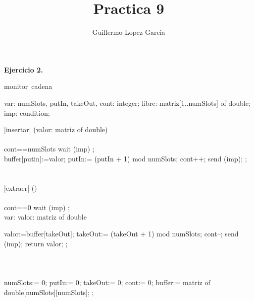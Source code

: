 \documentclass[]{article}
\title{Practica 9}
\author{Guillermo Lopez Garcia}
\begin{document}
\maketitle

\textbf{Ejercicio 2.}

\begin{program} %
\mbox{monitor cadena} %

var:
numSlots, putIn, takeOut, cont: integer;
libre: matriz[1..numSlots] of double;
imp: condition;

\PROC|insertar| (valor: matriz of double) \BODY\\ %

\BEGIN\\
\DO{}
\IF{} cont==numSlots \THEN{} wait (imp) \FI;\\
    buffer[putin]:=valor;
    putIn:= (putIn + 1) mod numSlots;
    cont++;
    send (imp);
\OD;\\

\END\\

\ENDPROC\\

\PROC|extraer| () \BODY\\ %

\BEGIN\\
\DO{}
\IF{} cont==0 \THEN{} wait (imp) \FI;\\
    var:
    valor: matriz of double
    
    valor:=buffer[takeOut];
    takeOut:= (takeOut + 1) mod numSlots;
    cont--;
    send (imp);
    return valor;
\OD;\\
\END\\

\ENDPROC\\

\BEGIN\\ %
\DO{}
    numSlots:= 0;
    putIn:= 0;
    takeOut:= 0;
    cont:= 0;
    buffer:= matriz of double[numSlots][numSlots];
\OD;\\
\END\\

\end{program}

\end{document}

